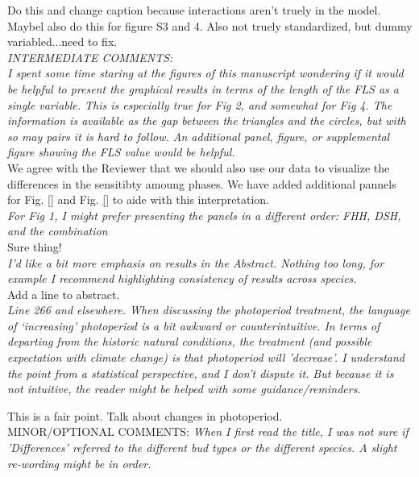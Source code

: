 \documentclass[11pt]{article}
\begin{document}
Do this and change caption because interactions aren't truely in the model. Maybel also do this for figure S3 and 4. Also not truely standardized, but dummy variabled...need to fix.\\ 


\emph{INTERMEDIATE COMMENTS:}\\
\emph{I spent some time staring at the figures of this manuscript wondering if it would be helpful to present the graphical results in terms of the length of the FLS as a single variable. This is especially true for Fig 2, and somewhat for Fig 4. The information is available as the gap between the triangles and the circles, but with so may pairs it is hard to follow. An additional panel, figure, or supplemental figure showing the FLS value would be helpful.}\\

We agree with the Reviewer that we should also use our data to visualize the differences in the sensitibty amoung phases. We have added additional pannels for Fig. \ref{} and Fig. \ref{} to aide with this interpretation.\\

\emph{For Fig 1, I might prefer presenting the panels in a different order: FHH, DSH, and the combination}\\

Sure thing!\\

\emph{I’d like a bit more emphasis on results in the Abstract. Nothing too long, for example I recommend highlighting consistency of results across species.}\\

Add a line to abstract.\\

\emph{Line 266 and elsewhere. When discussing the photoperiod treatment, the language of ‘increasing’ photoperiod is a bit awkward or counterintuitive. In terms of departing from the historic natural conditions, the treatment (and possible expectation with climate change) is that photoperiod will 'decrease'. I understand the point from a statistical perspective, and I don’t dispute it. But because it is not intuitive, the reader might be helped with some guidance/reminders.}

This is a fair point. Talk about changes in photoperiod.\\


MINOR/OPTIONAL COMMENTS:
\emph{When I first read the title, I was not sure if 'Differences' referred to the different bud types or the different species. A slight re-wording might be in order.}
\end{document}

